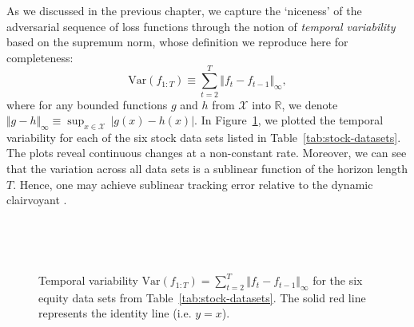 As we discussed in the previous chapter, we capture the `niceness' of the adversarial sequence of loss functions through the notion of \emph{temporal variability} based on the supremum norm, whose definition we reproduce here for completeness:
\begin{equation}
\label{eq:temporal-variability}
	\mathrm{Var}(f_{1:T})
	\equiv \sum_{t=2}^T \Vert f_t - f_{t-1} \Vert_\infty,
\end{equation}
where for any bounded functions $g$ and $h$ from $\mathcal{X}$ into $\mathbb{R}$, we denote $\Vert g - h \Vert_\infty \equiv \sup_{x \in \mathcal{X}} \, |g(x) - h(x)|$. In Figure~\ref{fig:temporal-variation}, we plotted the temporal variability for each of the six stock data sets listed in Table~\ref{tab:stock-datasets}. The plots reveal continuous changes at a non-constant rate. Moreover, we can see that the variation across all data sets is a sublinear function of the horizon length $T$. Hence, one may achieve sublinear tracking error relative to the dynamic clairvoyant \citep{besbes15}.
%    
\begin{mccorrection}
\begin{figure}[H]
\caption{Temporal variability $\mathrm{Var}(f_{1:T}) = \sum_{t=2}^T \Vert f_t - f_{t-1} \Vert_\infty$ for the six equity data sets from Table~\ref{tab:stock-datasets}. The solid red line represents the identity line (i.e. $y=x$).}
\label{fig:temporal-variation}
    \,
    \,
    
    \,
    \,
\end{figure}
\end{mccorrection}
